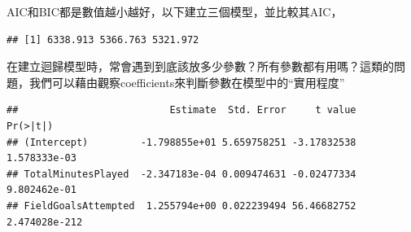 \documentclass[]{book}
\newenvironment{Shaded}{\begin{snugshade}}{\end{snugshade}}
\newcommand{\DataTypeTok}[1]{\textcolor[rgb]{0.13,0.29,0.53}{#1}}
\newcommand{\KeywordTok}[1]{\textcolor[rgb]{0.13,0.29,0.53}{\textbf{#1}}}
\newcommand{\NormalTok}[1]{#1}
\newcommand{\OperatorTok}[1]{\textcolor[rgb]{0.81,0.36,0.00}{\textbf{#1}}}
\begin{document}
AIC和BIC都是數值越小越好，以下建立三個模型，並比較其AIC，

\begin{Shaded}
\end{Shaded}

\begin{verbatim}
## [1] 6338.913 5366.763 5321.972
\end{verbatim}

在建立迴歸模型時，常會遇到到底該放多少參數？所有參數都有用嗎？這類的問題，我們可以藉由觀察coefficients來判斷參數在模型中的``實用程度''

\begin{Shaded}
\end{Shaded}

\begin{verbatim}
##                          Estimate  Std. Error     t value      Pr(>|t|)
## (Intercept)         -1.798855e+01 5.659758251 -3.17832538  1.578333e-03
## TotalMinutesPlayed  -2.347183e-04 0.009474631 -0.02477334  9.802462e-01
## FieldGoalsAttempted  1.255794e+00 0.022239494 56.46682752 2.474028e-212
\end{verbatim}

\begin{Shaded}
\end{Shaded}
\end{document}
